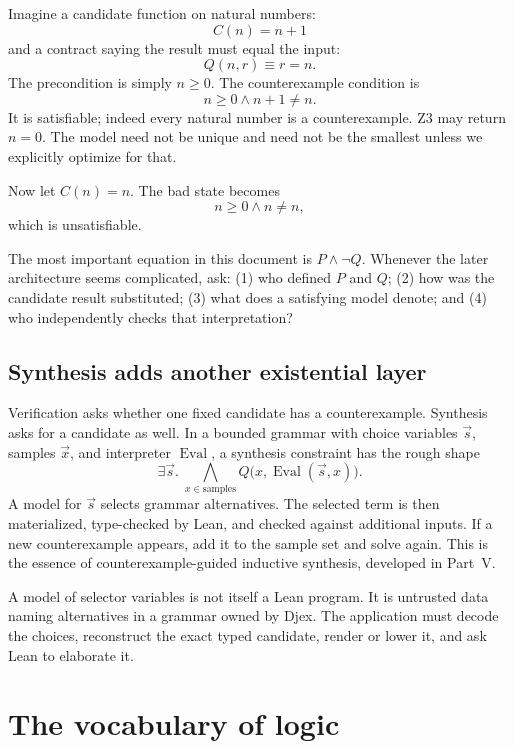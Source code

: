 \documentclass[10pt,letterpaper,oneside]{report}
\begin{document}
Imagine a candidate function on natural numbers:
\[
  C(n)=n+1
\]
and a contract saying the result must equal the input:
\[
  Q(n,r)\equiv r=n.
\]
The precondition is simply $n\ge 0$. The counterexample condition is
\[
  n\ge 0\land n+1\ne n.
\]
It is satisfiable; indeed every natural number is a counterexample. Z3 may return $n=0$. The model need not be unique and need not be the smallest unless we explicitly optimize for that.

Now let $C(n)=n$. The bad state becomes
\[
  n\ge 0\land n\ne n,
\]
which is unsatisfiable.

\begin{checkpoint}
The most important equation in this document is $P\land\neg Q$. Whenever the later architecture seems complicated, ask: (1) who defined $P$ and $Q$; (2) how was the candidate result substituted; (3) what does a satisfying model denote; and (4) who independently checks that interpretation?
\end{checkpoint}

\section{Synthesis adds another existential layer}

Verification asks whether one fixed candidate has a counterexample. Synthesis asks for a candidate as well. In a bounded grammar with choice variables $\vec{s}$, samples $\vec{x}$, and interpreter $\operatorname{Eval}$, a synthesis constraint has the rough shape
\[
  \exists\vec{s}.\;\bigwedge_{x\in\text{samples}}
    Q\bigl(x,\operatorname{Eval}(\vec{s},x)\bigr).
\]
A model for $\vec{s}$ selects grammar alternatives. The selected term is then materialized, type-checked by Lean, and checked against additional inputs. If a new counterexample appears, add it to the sample set and solve again. This is the essence of counterexample-guided inductive synthesis, developed in Part~V.

\begin{trustbox}
A model of selector variables is not itself a Lean program. It is untrusted data naming alternatives in a grammar owned by Djex. The application must decode the choices, reconstruct the exact typed candidate, render or lower it, and ask Lean to elaborate it.
\end{trustbox}

\chapter{The vocabulary of logic}
\label{chap:logic-vocabulary}
\end{document}
